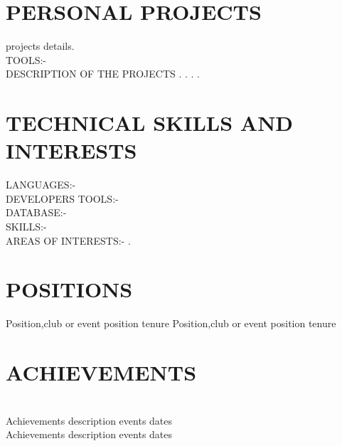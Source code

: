 \documentclass{article}
\begin{document}
\section{PERSONAL PROJECTS}
\hline
\item {projects details.}
\\TOOLS:-
\\DESCRIPTION OF THE PROJECTS        
\newline.
\newline.
\newline.
\newline.
\section{TECHNICAL SKILLS AND INTERESTS}
\hline
\item{LANGUAGES:-}
\\DEVELOPERS TOOLS:-
\\DATABASE:-
\\SKILLS:-
\\AREAS OF INTERESTS:-
\newline.
\section{POSITIONS}
\hline
\item{Position,club or event}           \hspace{5cm} position tenure
\newline
Position,club or event           \hspace{5cm} position tenure
\newline
\section{ACHIEVEMENTS}
\hline
\\Achievements description          \hspace{5cm}events dates
\newline
\\Achievements description          \hspace{5cm}events dates
\end{document}
